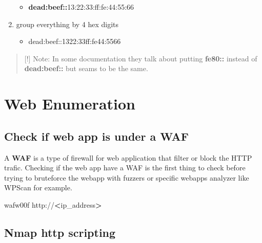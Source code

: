 \documentclass{assets/ipesethesis}
\newenvironment{Shaded}{\begin{snugshade}}{\end{snugshade}}
\newcommand{\ExtensionTok}[1]{#1}
\newcommand{\NormalTok}[1]{#1}
\newcommand{\OperatorTok}[1]{\textcolor[rgb]{0.81,0.36,0.00}{\textbf{#1}}}
\providecommand{\tightlist}{%
  \setlength{\itemsep}{0pt}\setlength{\parskip}{0pt}}
\begin{document}
\begin{enumerate}
  \begin{itemize}
  \tightlist
  \item
    \textbf{dead:beef::}13:22:33:ff:fe:44:55:66\\
  \end{itemize}
\item
  group everything by 4 hex digits

  \begin{itemize}
  \tightlist
  \item
    dead:beef::1322:33ff:fe44:5566
  \end{itemize}
\end{enumerate}

\begin{quote}
{[}!{]} Note: In some documentation they talk about putting \textbf{fe80::} instead of \textbf{dead:beef::} but seams to be the same.
\end{quote}

\hypertarget{web-enumeration}{%
\chapter*{Web Enumeration}\label{web-enumeration}}

\hypertarget{check-if-web-app-is-under-a-waf}{%
\section*{Check if web app is under a WAF}\label{check-if-web-app-is-under-a-waf}}

A \textbf{WAF} is a type of firewall for web application that filter or block the HTTP trafic. Checking if the web app have a WAF
is the first thing to check before trying to bruteforce the webapp with fuzzers or specific webapps analyzer like WPScan for example.

\begin{Shaded}
\begin{Highlighting}[]
\ExtensionTok{wafw00f}\NormalTok{ http://}\OperatorTok{<}\NormalTok{ip_address}\OperatorTok{>}
\end{Highlighting}
\end{Shaded}

\hypertarget{nmap-http-scripting}{%
\section*{Nmap http scripting}\label{nmap-http-scripting}}
\end{document}
